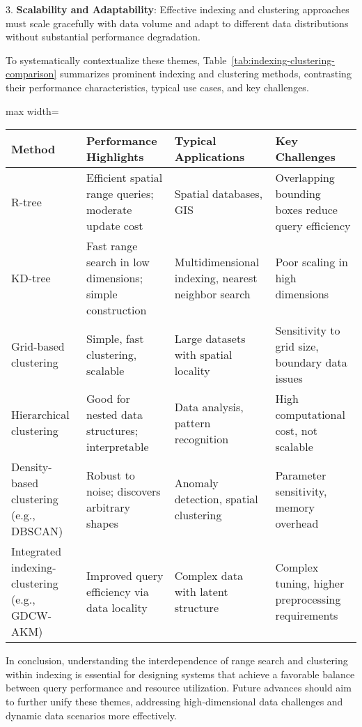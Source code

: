 \documentclass[sigconf]{acmart}
\begin{document}
3. \textbf{Scalability and Adaptability}: Effective indexing and clustering approaches must scale gracefully with data volume and adapt to different data distributions without substantial performance degradation.

To systematically contextualize these themes, Table~\ref{tab:indexing-clustering-comparison} summarizes prominent indexing and clustering methods, contrasting their performance characteristics, typical use cases, and key challenges.

\begin{table*}[htbp]
\centering
\caption{Comparison of Indexing and Clustering Methods: Performance, Use Cases, and Challenges}
\label{tab:indexing-clustering-comparison}
\begin{adjustbox}{max width=\textwidth}
\begin{tabular}{@{}llll@{}}
\toprule
\textbf{Method} & \textbf{Performance Highlights} & \textbf{Typical Applications} & \textbf{Key Challenges} \\ \midrule
R-tree & Efficient spatial range queries; moderate update cost & Spatial databases, GIS & Overlapping bounding boxes reduce query efficiency \\
KD-tree & Fast range search in low dimensions; simple construction & Multidimensional indexing, nearest neighbor search & Poor scaling in high dimensions \\
Grid-based clustering & Simple, fast clustering, scalable & Large datasets with spatial locality & Sensitivity to grid size, boundary data issues \\
Hierarchical clustering & Good for nested data structures; interpretable & Data analysis, pattern recognition & High computational cost, not scalable \\
Density-based clustering (e.g., DBSCAN) & Robust to noise; discovers arbitrary shapes & Anomaly detection, spatial clustering & Parameter sensitivity, memory overhead \\
Integrated indexing-clustering (e.g., GDCW-AKM) & Improved query efficiency via data locality & Complex data with latent structure & Complex tuning, higher preprocessing requirements \\ \bottomrule
\end{tabular}
\end{adjustbox}
\end{table*}

In conclusion, understanding the interdependence of range search and clustering within indexing is essential for designing systems that achieve a favorable balance between query performance and resource utilization. Future advances should aim to further unify these themes, addressing high-dimensional data challenges and dynamic data scenarios more effectively.
\end{document}
